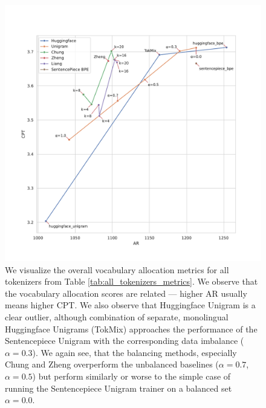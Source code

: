 \begin{figure}[H]
    \centering
    \includegraphics[width=\textwidth]{figures/all_tokenizers_AR_vs_CPT.pdf}
    \caption{We visualize the overall vocabulary allocation metrics for all tokenizers from Table \ref{tab:all_tokenizers_metrics}. We observe that the vocabulary allocation scores are related --- higher AR usually means higher CPT.  We also observe that Huggingface Unigram is a clear outlier, although combination of separate, monolingual Huggingface Unigrams (TokMix) approaches the performance of the Sentencepiece Unigram with the corresponding data imbalance ($\alpha=0.3$). We again see, that the balancing methods, especially Chung and Zheng overperform the unbalanced baselines ($\alpha=0.7$, $\alpha=0.5$) but perform similarly or worse to the simple case of running the Sentencepiece Unigram trainer on a balanced set $\alpha=0.0$.}
    \label{fig:all_tokenizers_AR_vs_CPT}
\end{figure}

